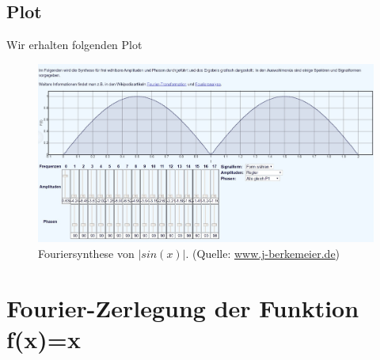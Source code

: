 \subsection{Plot}
Wir erhalten folgenden Plot
\begin{figure}
  \centering
  \includegraphics[width=\textwidth]{content/screenshot_phase90}
  \caption{Fouriersynthese von $|sin(x)|$. (Quelle: \href{https://www.j-berkemeier.de/Fouriersynthese.html}{www.j-berkemeier.de})}
  \label{fig:sin}
\end{figure}
\section{Fourier-Zerlegung der Funktion f(x)=x }
